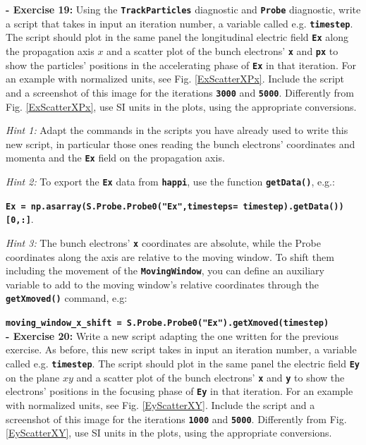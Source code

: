 \documentclass[a4paper,12pt]{extarticle}
\newcommand{\commandline}[1]{\texttt{\textbf{#1}}}
\begin{document}
\textbf{- Exercise 19:} Using the \commandline{TrackParticles} diagnostic and \commandline{Probe} diagnostic, write a script that takes in input an iteration number, a variable called e.g. \commandline{timestep}. The script should plot in the same panel the longitudinal electric field \commandline{Ex} along the propagation axis $x$ and a scatter plot of the bunch electrons' \commandline{x} and \commandline{px} to show the particles' positions in the accelerating phase of \commandline{Ex} in that iteration. For an example with normalized units, see Fig. \ref{ExScatterXPx}. Include the script and a screenshot of this image for the iterations \commandline{3000} and \commandline{5000}.  Differently from Fig.  \ref{ExScatterXPx}, use SI units in the plots, using the appropriate conversions.

\textit{Hint 1:} Adapt the commands in the scripts you have already used to write this new script, in particular those ones reading the bunch electrons' coordinates and momenta and the \commandline{Ex} field on the propagation axis.

\textit{Hint 2:} To export the \commandline{Ex} data from \commandline{happi}, use the function \commandline{getData()}, e.g.:

\commandline{Ex = np.asarray(S.Probe.Probe0("Ex",timesteps= timestep).getData())[0,:]}.

\textit{Hint 3:} The bunch electrons' \commandline{x} coordinates are absolute, while the Probe coordinates along the axis are relative to the moving window. To shift them including the movement of the \commandline{MovingWindow}, you can define an auxiliary variable to add to the moving window's relative coordinates through the \commandline{getXmoved()} command, e.g:

\commandline{moving\_window\_x\_shift = S.Probe.Probe0("Ex").getXmoved(timestep)}
\\



\textbf{- Exercise 20:} Write a new script adapting the one written for the previous exercise. As before, this new script takes in input an iteration number, a variable called e.g. \commandline{timestep}. The script should plot in the same panel the electric field \commandline{Ey} on the plane $xy$ and a scatter plot of the bunch electrons' \commandline{x} and \commandline{y} to show the electrons' positions in the focusing phase of \commandline{Ey} in that iteration. For an example with normalized units, see Fig. \ref{EyScatterXY}. Include the script and a screenshot of this image for the iterations \commandline{1000} and \commandline{5000}. Differently from Fig.  \ref{EyScatterXY}, use SI units in the plots, using the appropriate conversions.
\end{document}
